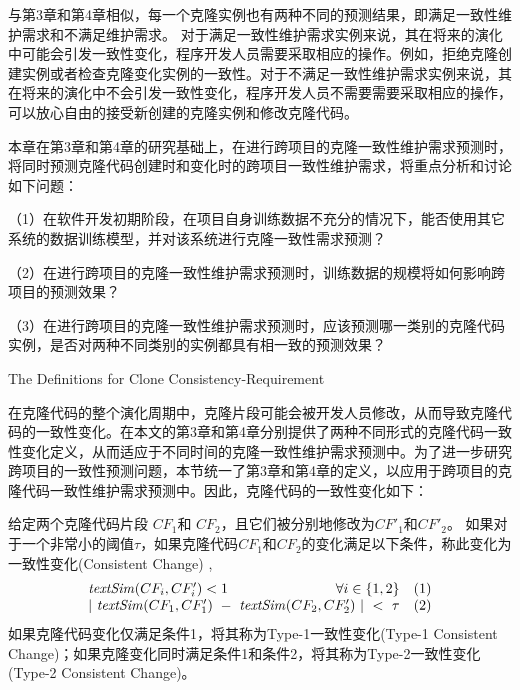 与第3章和第4章相似，每一个克隆实例也有两种不同的预测结果，即满足一致性维护需求和不满足维护需求。
对于满足一致性维护需求实例来说，其在将来的演化中可能会引发一致性变化，程序开发人员需要采取相应的操作。例如，拒绝克隆创建实例或者检查克隆变化实例的一致性。对于不满足一致性维护需求实例来说，其在将来的演化中不会引发一致性变化，程序开发人员不需要需要采取相应的操作，可以放心自由的接受新创建的克隆实例和修改克隆代码。

本章在第3章和第4章的研究基础上，在进行跨项目的克隆一致性维护需求预测时，将同时预测克隆代码创建时和变化时的跨项目一致性维护需求，将重点分析和讨论如下问题：


（1）在软件开发初期阶段，在项目自身训练数据不充分的情况下，能否使用其它系统的数据训练模型，并对该系统进行克隆一致性需求预测？

（2）在进行跨项目的克隆一致性维护需求预测时，训练数据的规模将如何影响跨项目的预测效果？%

（3）在进行跨项目的克隆一致性维护需求预测时，应该预测哪一类别的克隆代码实例，是否对两种不同类别的实例都具有相一致的预测效果？

{The Definitions for Clone Consistency-Requirement}

在克隆代码的整个演化周期中，克隆片段可能会被开发人员修改，从而导致克隆代码的一致性变化。在本文的第3章和第4章分别提供了两种不同形式的克隆代码一致性变化定义，从而适应于不同时间的克隆一致性维护需求预测中。为了进一步研究跨项目的一致性预测问题，本节统一了第3章和第4章的定义，以应用于跨项目的克隆代码一致性维护需求预测中。因此，克隆代码的一致性变化如下：

\begin{definition}[克隆一致性变化]  
\label{def-change}
给定两个克隆代码片段 $CF_1$和 $CF_2$，且它们被分别地修改为$CF'_1$和$CF'_2$。 如果对于一个非常小的阈值$\tau$，如果克隆代码$CF_1$和$CF_2$的变化满足以下条件，称此变化为一致性变化(Consistent Change) , 
\[
\begin{array}[t]{crl}
 \mathit{textSim}(CF_i, CF'_i) < 1 & \forall i \in \{1,2\} &(1) \\
 \multicolumn{2}{c}{| ~\mathit{textSim}(CF_1,CF'_1)  ~-~ \mathit{textSim}(CF_2,CF'_2) ~| ~< ~ \tau}  & (2)
\end{array}
\]
如果克隆代码变化仅满足条件1，将其称为Type-1一致性变化(Type-1 Consistent Change)；如果克隆变化同时满足条件1和条件2，将其称为Type-2一致性变化(Type-2 Consistent Change)。
\end{definition}

